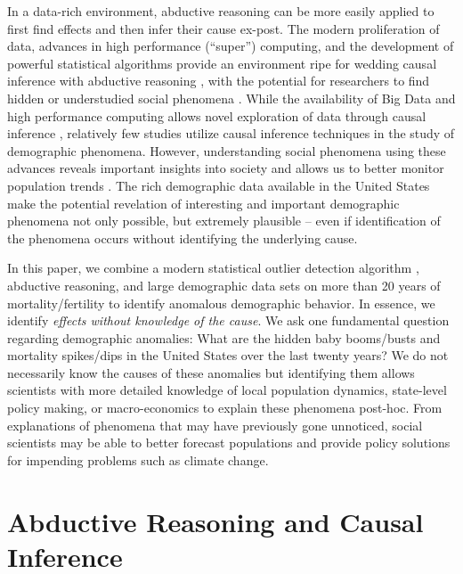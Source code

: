 \documentclass[12pt]{article}
\begin{document}
In a data-rich environment, abductive reasoning can be more easily
applied to first find effects and then infer their cause ex-post. The
modern proliferation of data, advances in high performance (``super'')
computing, and the development of powerful statistical algorithms
provide an environment ripe for wedding causal inference with abductive
reasoning \citep{van2016data, zikopoulos2011}, with the potential for
researchers to find hidden or understudied social phenomena
\citep{bohon2018demography}. While the availability of Big Data and high
performance computing allows novel exploration of data through causal
inference
\citep{bohon2018demography, rcausalimpact, shiffrin2016drawing},
relatively few studies utilize causal inference techniques in the study
of demographic phenomena. However, understanding social phenomena using
these advances reveals important insights into society
\citep{angrist1989lifetime, mas2009peers} and allows us to better
monitor population trends \citep{nobles2019, torche2015hidden}. The rich
demographic data available in the United States make the potential
revelation of interesting and important demographic phenomena not only
possible, but extremely plausible -- even if identification of the
phenomena occurs without identifying the underlying cause.

In this paper, we combine a modern statistical outlier detection
algorithm \citep{chen1993joint}, abductive reasoning, and large
demographic data sets on more than 20 years of mortality/fertility to
identify anomalous demographic behavior. In essence, we identify
\emph{effects without knowledge of the cause}. We ask one fundamental
question regarding demographic anomalies: What are the hidden baby
booms/busts and mortality spikes/dips in the United States over the last
twenty years? We do not necessarily know the causes of these anomalies
but identifying them allows scientists with more detailed knowledge of
local population dynamics, state-level policy making, or macro-economics
to explain these phenomena post-hoc. From explanations of phenomena that
may have previously gone unnoticed, social scientists may be able to
better forecast populations and provide policy solutions for impending
problems such as climate change.

\hypertarget{abductive-reasoning-and-causal-inference}{%
\section{Abductive Reasoning and Causal
Inference}\label{abductive-reasoning-and-causal-inference}}
\end{document}
